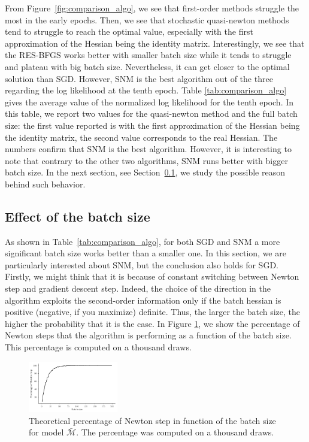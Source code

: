\documentclass[conference]{IEEEtran}
\begin{document}
From Figure~\ref{fig:comparison_algo}, we see that first-order methods struggle the most in the early epochs. Then, we see that stochastic quasi-newton methods tend to struggle to reach the optimal value, especially with the first approximation of the Hessian being the identity matrix. Interestingly, we see that the RES-BFGS works better with smaller batch size while it tends to struggle and plateau with big batch size. Nevertheless, it can get closer to the optimal solution than SGD. However, SNM is the best algorithm out of the three regarding the log likelihood at the tenth epoch. Table \ref{tab:comparison_algo} gives the average value of the normalized log likelihood for the tenth epoch. In this table, we report two values for the quasi-newton method and the full batch size: the first value reported is with the first approximation of the Hessian being the identity matrix, the second value corresponds to the real Hessian. The numbers confirm that SNM is the best algorithm. However, it is interesting to note that contrary to the other two algorithms, SNM runs better with bigger batch size. In the next section, see Section~\ref{sec:effect_bs}, we study the possible reason behind such behavior.

\subsection{Effect of the batch size}
\label{sec:effect_bs}

As shown in Table~\ref{tab:comparison_algo}, for both SGD and SNM a more significant batch size works better than a smaller one. In this section, we are particularly interested about SNM, but the conclusion also holds for SGD. Firstly, we might think that it is because of constant switching between Newton step and gradient descent step. Indeed, the choice of the direction in the algorithm exploits the second-order information only if the batch hessian is positive (negative, if you maximize) definite. Thus, the larger the batch size, the higher the probability that it is the case. In Figure \ref{fig:perc_newton}, we show the percentage of Newton steps that the algorithm is performing as a function of the batch size. This percentage is computed on a thousand draws. \\

\begin{figure}[t]
\centering
\includegraphics[width=0.35\textwidth]{../figures/perc_newton.pdf}
\vspace{-0.3cm}
\caption{Theoretical percentage of Newton step in function of the batch size for model $\bar{\mathcal{M}}$. The percentage was computed on a thousand draws.}
\label{fig:perc_newton}
\vspace{-0.3cm}
\end{figure}
\end{document}
